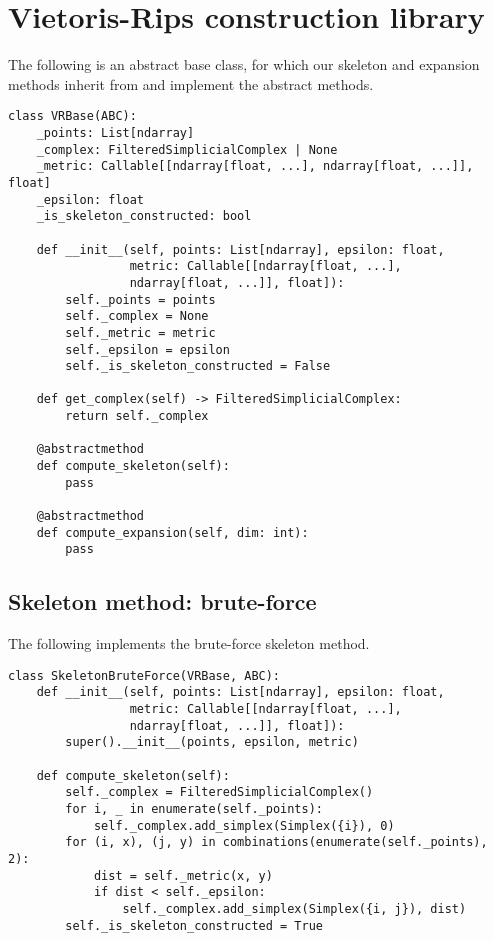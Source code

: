 \section{Vietoris-Rips construction library}

The following is an abstract base class, for which our skeleton and expansion methods inherit from and implement the abstract methods. 

\begin{verbatim}
class VRBase(ABC):
    _points: List[ndarray]
    _complex: FilteredSimplicialComplex | None
    _metric: Callable[[ndarray[float, ...], ndarray[float, ...]], float]
    _epsilon: float
    _is_skeleton_constructed: bool

    def __init__(self, points: List[ndarray], epsilon: float,
                 metric: Callable[[ndarray[float, ...], 
                 ndarray[float, ...]], float]):
        self._points = points
        self._complex = None
        self._metric = metric
        self._epsilon = epsilon
        self._is_skeleton_constructed = False

    def get_complex(self) -> FilteredSimplicialComplex:
        return self._complex

    @abstractmethod
    def compute_skeleton(self):
        pass

    @abstractmethod
    def compute_expansion(self, dim: int):
        pass
\end{verbatim}

\subsection{Skeleton method: brute-force}

The following implements the brute-force skeleton method. 

\begin{verbatim}
class SkeletonBruteForce(VRBase, ABC):
    def __init__(self, points: List[ndarray], epsilon: float,
                 metric: Callable[[ndarray[float, ...], 
                 ndarray[float, ...]], float]):
        super().__init__(points, epsilon, metric)

    def compute_skeleton(self):
        self._complex = FilteredSimplicialComplex()
        for i, _ in enumerate(self._points):
            self._complex.add_simplex(Simplex({i}), 0)
        for (i, x), (j, y) in combinations(enumerate(self._points), 2):
            dist = self._metric(x, y)
            if dist < self._epsilon:
                self._complex.add_simplex(Simplex({i, j}), dist)
        self._is_skeleton_constructed = True
\end{verbatim}

